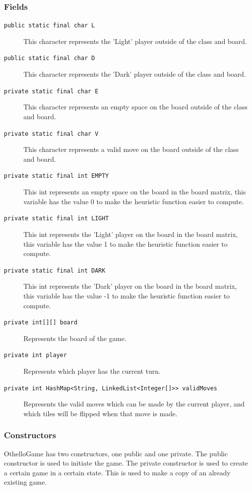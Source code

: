 \documentclass[a4paper]{article}
\begin{document}
\subsubsection{Fields}
\begin{description}
\item[\texttt{public static final char L}] This character represents the 'Light' player outside of the class and board.
\item[\texttt{public static final char D}] This character represents the 'Dark' player outside of the class and board.
\item[\texttt{private static final char E}] This character represents an empty space on the board outside of the class and board.
\item[\texttt{private static final char V}] This character represents a valid move on the board outside of the class and board.
\item[\texttt{private static final int EMPTY}] This int represents an empty space on the board in the board matrix, this variable has the value 0 to make the heuristic function easier to compute. 
\item[\texttt{private static final int LIGHT}] This int represents the 'Light' player on the board in the board matrix, this variable has the value 1 to make the heuristic function easier to compute. 
\item[\texttt{private static final int DARK}] This int represents the 'Dark' player on the board in the board matrix, this variable has the value -1 to make the heuristic function easier to compute. 
\item[\texttt{private int[][] board}] Represents the board of the game.
\item[\texttt{private int player}] Represents which player has the current turn.
\item[\texttt{private int HashMap<String, LinkedList<Integer[]>> validMoves}] Represents the valid moves which can be made by the current player, and which tiles will be flipped when that move is made.
\end{description} 
\subsubsection{Constructors}
OthelloGame has two constructors, one public and one private. The public constructor is used to initiate the game. The private constructor is used to create a certain game in a certain state. This is used to make a copy of an already existing game.
\end{document}
